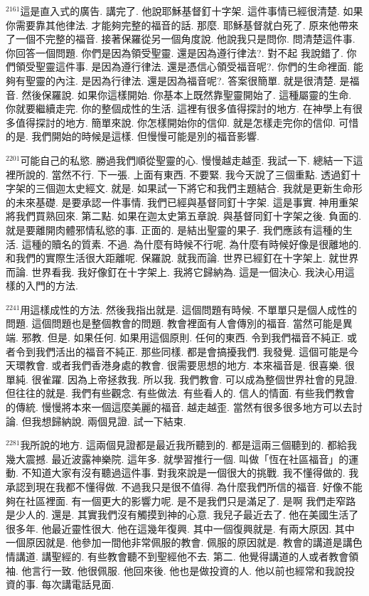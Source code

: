 \documentclass{book}
\begin{document}
$^{2161}$這是直入式的廣告.
講完了.
他說耶穌基督釘十字架.
這件事情已經很清楚.
如果你需要靠其他律法.
才能夠完整的福音的話.
那麼.
耶穌基督就白死了.
原來他帶來了一個不完整的福音.
接著保羅從另一個角度說.
他說我只是問你.
問清楚這件事.
你回答一個問題.
你們是因為領受聖靈.
還是因為遵行律法?.
對不起 我說錯了.
你們領受聖靈這件事.
是因為遵行律法.
還是憑信心領受福音呢?.
你們的生命裡面.
能夠有聖靈的內注.
是因為行律法.
還是因為福音呢?.
答案很簡單.
就是很清楚.
是福音.
然後保羅說.
如果你這樣開始.
你基本上既然靠聖靈開始了.
這種屬靈的生命.
你就要繼續走完.
你的整個成性的生活.
這裡有很多值得探討的地方.
在神學上有很多值得探討的地方.
簡單來說.
你怎樣開始你的信仰.
就是怎樣走完你的信仰.
可惜的是.
我們開始的時候是這樣.
但慢慢可能是別的福音影響.

$^{2201}$可能自己的私慾.
勝過我們順從聖靈的心.
慢慢越走越歪.
我試一下.
總結一下這裡所說的.
當然不行.
下一張.
上面有東西.
不要緊.
我今天說了三個重點.
透過釘十字架的三個迦太史經文.
就是.
如果試一下將它和我們主題結合.
我就是更新生命形的未來基礎.
是要承認一件事情.
我們已經與基督同釘十字架.
這是事實.
神用重架將我們買熟回來.
第二點.
如果在迦太史第五章說.
與基督同釘十字架之後.
負面的.
就是要離開肉體邪情私慾的事.
正面的.
是結出聖靈的果子.
我們應該有這種的生活.
這種的贖名的質素.
不過.
為什麼有時候不行呢.
為什麼有時候好像是很離地的.
和我們的實際生活很大距離呢.
保羅說.
就我而論.
世界已經釘在十字架上.
就世界而論.
世界看我.
我好像釘在十字架上.
我將它歸納為.
這是一個決心.
我決心用這樣的入門的方法.

$^{2241}$用這樣成性的方法.
然後我指出就是.
這個問題有時候.
不單單只是個人成性的問題.
這個問題也是整個教會的問題.
教會裡面有人會傳別的福音.
當然可能是異端.
邪教.
但是.
如果任何.
如果用這個原則.
任何的東西.
令到我們福音不純正.
或者令到我們活出的福音不純正.
那些同樣.
都是會搞擾我們.
我發覺.
這個可能是今天環教會.
或者我們香港身處的教會.
很需要思想的地方.
本來福音是.
很喜樂.
很單純.
很雀躍.
因為上帝拯救我.
所以我.
我們教會.
可以成為整個世界社會的見證.
但往往的就是.
我們有些觀念.
有些做法.
有些看人的.
信人的情面.
有些我們教會的傳統.
慢慢將本來一個這麼美麗的福音.
越走越歪.
當然有很多很多地方可以去討論.
但我想歸納說.
兩個見證.
試一下結束.

$^{2281}$我所說的地方.
這兩個見證都是最近我所聽到的.
都是這兩三個聽到的.
都給我幾大震撼.
最近波露神樂院.
這年多.
就學習推行一個.
叫做「恆在社區福音」的運動.
不知道大家有沒有聽過這件事.
對我來說是一個很大的挑戰.
我不懂得做的.
我承認到現在我都不懂得做.
不過我只是很不值得.
為什麼我們所信的福音.
好像不能夠在社區裡面.
有一個更大的影響力呢.
是不是我們只是滿足了.
是啊 我們走窄路是少人的.
還是.
其實我們沒有觸摸到神的心意.
我兒子最近去了.
他在美國生活了很多年.
他最近靈性很大.
他在這幾年復興.
其中一個復興就是.
有兩大原因.
其中一個原因就是.
他參加一間他非常佩服的教會.
佩服的原因就是.
教會的講道是講色情講道.
講聖經的.
有些教會聽不到聖經他不去.
第二.
他覺得講道的人或者教會領袖.
他言行一致.
他很佩服.
他回來後.
他也是做投資的人.
他以前也經常和我說投資的事.
每次講電話見面.
\end{document}
